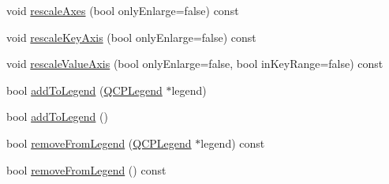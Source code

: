 \begin{DoxyCompactItemize}
\item 
void \mbox{\hyperlink{class_q_c_p_abstract_plottable_a1491c4a606bccd2d09e65e11b79eb882}{rescale\+Axes}} (bool only\+Enlarge=false) const
\item 
void \mbox{\hyperlink{class_q_c_p_abstract_plottable_ae96b83c961e257da116c6acf9c7da308}{rescale\+Key\+Axis}} (bool only\+Enlarge=false) const
\item 
void \mbox{\hyperlink{class_q_c_p_abstract_plottable_a714eaf36b12434cd71846215504db82e}{rescale\+Value\+Axis}} (bool only\+Enlarge=false, bool in\+Key\+Range=false) const
\item 
bool \mbox{\hyperlink{class_q_c_p_abstract_plottable_aa64e93cb5b606d8110d2cc0a349bb30f}{add\+To\+Legend}} (\mbox{\hyperlink{class_q_c_p_legend}{Q\+C\+P\+Legend}} $\ast$legend)
\item 
bool \mbox{\hyperlink{class_q_c_p_abstract_plottable_a70f8cabfd808f7d5204b9f18c45c13f5}{add\+To\+Legend}} ()
\item 
bool \mbox{\hyperlink{class_q_c_p_abstract_plottable_a3cc235007e2343a65ad4f463767e0e20}{remove\+From\+Legend}} (\mbox{\hyperlink{class_q_c_p_legend}{Q\+C\+P\+Legend}} $\ast$legend) const
\item 
bool \mbox{\hyperlink{class_q_c_p_abstract_plottable_ac95fb2604d9106d0852ad9ceb326fe8c}{remove\+From\+Legend}} () const
\end{DoxyCompactItemize}
